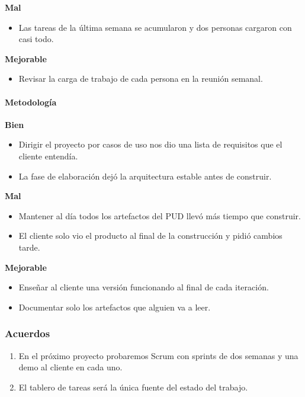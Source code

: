 \textbf{Mal}

\begin{itemize}
\item Las tareas de la última semana se acumularon y dos personas cargaron con casi todo.
\end{itemize}

\textbf{Mejorable}

\begin{itemize}
\item Revisar la carga de trabajo de cada persona en la reunión semanal.
\end{itemize}

\paragraph*{Metodología}

\textbf{Bien}

\begin{itemize}
\item Dirigir el proyecto por casos de uso nos dio una lista de requisitos que el cliente entendía.
\item La fase de elaboración dejó la arquitectura estable antes de construir.
\end{itemize}

\textbf{Mal}

\begin{itemize}
\item Mantener al día todos los artefactos del PUD llevó más tiempo que construir.
\item El cliente solo vio el producto al final de la construcción y pidió cambios tarde.
\end{itemize}

\textbf{Mejorable}

\begin{itemize}
\item Enseñar al cliente una versión funcionando al final de cada iteración.
\item Documentar solo los artefactos que alguien va a leer.
\end{itemize}

\subsubsection*{Acuerdos}

\begin{enumerate}
\item En el próximo proyecto probaremos Scrum con sprints de dos semanas y una demo al cliente en cada uno.
\item El tablero de tareas será la única fuente del estado del trabajo.
\end{enumerate}

